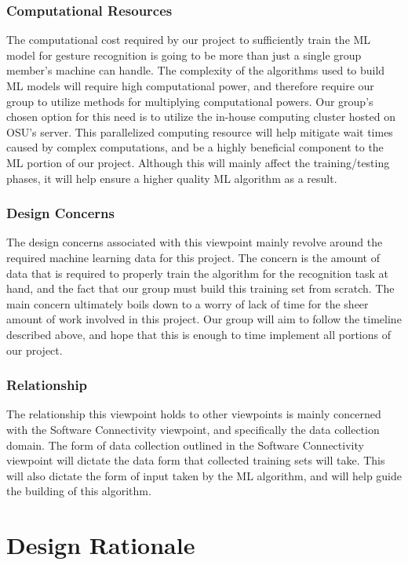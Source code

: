 \documentclass[onecolumn, draftclsnofoot,10pt, compsoc]{IEEEtran}
\begin{document}
\subsubsection{Computational Resources}
The computational cost required by our project to sufficiently train the ML model for gesture recognition is going to be more than just a single group member’s machine can handle. The complexity of the algorithms used to build ML models will require high computational power, and therefore require our group to utilize methods for multiplying computational powers. Our group's chosen option for this need is to utilize the in-house computing cluster hosted on OSU's server. This parallelized computing resource will help mitigate wait times caused by complex computations, and be a highly beneficial component to the ML portion of our project. Although this will mainly affect the training/testing phases, it will help ensure a higher quality ML algorithm as a result. 
\subsubsection{Design Concerns}
The design concerns associated with this viewpoint mainly revolve around the required machine learning data for this project. The concern is the amount of data that is required to properly train the algorithm for the recognition task at hand, and the fact that our group must build this training set from scratch. The main concern ultimately boils down to a worry of lack of time for the sheer amount of work involved in this project. Our group will aim to follow the timeline described above, and hope that this is enough to time implement all portions of our project.
\subsubsection{Relationship}
The relationship this viewpoint holds to other viewpoints is mainly concerned with the Software Connectivity viewpoint, and specifically the data collection domain. The form of data collection outlined in the Software Connectivity viewpoint will dictate the data form that collected training sets will take. This will also dictate the form of input taken by the ML algorithm, and will help guide the building of this algorithm. 
\section{Design Rationale}
\end{document}
